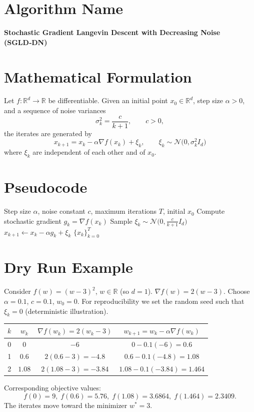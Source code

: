 \documentclass[11pt]{article}
\newcommand{\R}{\mathbb{R}}
\begin{document}
\section*{Algorithm Name}
\textbf{Stochastic Gradient Langevin Descent with Decreasing Noise (SGLD‑DN)}

\section*{Mathematical Formulation}
Let $f:\R^{d}\to\R$ be differentiable.  
Given an initial point $x_{0}\in\R^{d}$, step size $\alpha>0$, and a sequence of noise variances
\[
\sigma_{k}^{2}= \frac{c}{k+1},\qquad c>0,
\]
the iterates are generated by
\begin{equation}
\boxed{\,x_{k+1}=x_{k}-\alpha \nabla f(x_{k})+\xi_{k},\qquad 
\xi_{k}\sim\mathcal N\!\big(0,\sigma_{k}^{2}I_{d}\big)\,}
\tag{1}
\end{equation}
where $\xi_{k}$ are independent of each other and of $x_{0}$.

\section*{Pseudocode}
\begin{algorithm}[H]
\caption{SGLD‑DN}
\begin{algorithmic}[1]
\Require Step size $\alpha$, noise constant $c$, maximum iterations $T$, initial $x_{0}$
    \State Compute stochastic gradient $g_{k}= \nabla f(x_{k})$  
    \State Sample $\xi_{k}\sim\mathcal N\!\big(0,\frac{c}{k+1}I_{d}\big)$
    \State $x_{k+1}\gets x_{k}-\alpha g_{k}+\xi_{k}$
\EndFor
\State \Return $\{x_{k}\}_{k=0}^{T}$
\end{algorithmic}
\end{algorithm}

\section*{Dry Run Example}
Consider $f(w)=(w-3)^{2}$, $w\in\R$ (so $d=1$).  
$\nabla f(w)=2(w-3)$.  
Choose $\alpha=0.1$, $c=0.1$, $w_{0}=0$.  
For reproducibility we set the random seed such that $\xi_{k}=0$ (deterministic illustration).

\begin{center}
\begin{tabular}{c|c|c|c}
$k$ & $w_{k}$ & $\nabla f(w_{k})=2(w_{k}-3)$ & $w_{k+1}=w_{k}-\alpha\nabla f(w_{k})$\\\hline
0 & $0$ & $-6$ & $0-0.1(-6)=0.6$\\
1 & $0.6$ & $2(0.6-3)=-4.8$ & $0.6-0.1(-4.8)=1.08$\\
2 & $1.08$ & $2(1.08-3)=-3.84$ & $1.08-0.1(-3.84)=1.464$\\
\end{tabular}
\end{center}
Corresponding objective values:
\[
f(0)=9,\; f(0.6)=5.76,\; f(1.08)=3.6864,\; f(1.464)=2.3409.
\]
The iterates move toward the minimizer $w^{*}=3$.
\end{document}
